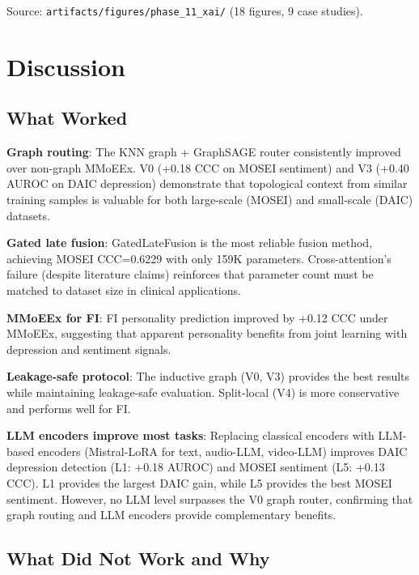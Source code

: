 \documentclass[12pt,oneside]{book}
\begin{document}
\begin{itemize}
Source: \texttt{artifacts/figures/phase\_11\_xai/} (18 figures, 9 case studies).

\section{Discussion}

\subsection{What Worked}

\textbf{Graph routing}: The KNN graph + GraphSAGE router consistently improved over non-graph MMoEEx. V0 (+0.18 CCC on MOSEI sentiment) and V3 (+0.40 AUROC on DAIC depression) demonstrate that topological context from similar training samples is valuable for both large-scale (MOSEI) and small-scale (DAIC) datasets.

\textbf{Gated late fusion}: GatedLateFusion is the most reliable fusion method, achieving MOSEI CCC=0.6229 with only 159K parameters. Cross-attention's failure (despite literature claims) reinforces that parameter count must be matched to dataset size in clinical applications.

\textbf{MMoEEx for FI}: FI personality prediction improved by +0.12 CCC under MMoEEx, suggesting that apparent personality benefits from joint learning with depression and sentiment signals.

\textbf{Leakage-safe protocol}: The inductive graph (V0, V3) provides the best results while maintaining leakage-safe evaluation. Split-local (V4) is more conservative and performs well for FI.

\textbf{LLM encoders improve most tasks}: Replacing classical encoders with LLM-based encoders (Mistral-LoRA for text, audio-LLM, video-LLM) improves DAIC depression detection (L1: +0.18 AUROC) and MOSEI sentiment (L5: +0.13 CCC). L1 provides the largest DAIC gain, while L5 provides the best MOSEI sentiment. However, no LLM level surpasses the V0 graph router, confirming that graph routing and LLM encoders provide complementary benefits.

\subsection{What Did Not Work and Why}


\end{itemize}
\end{document}
